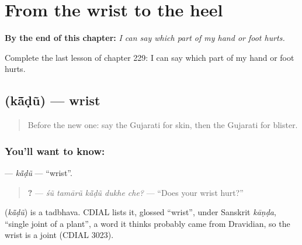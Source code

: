 
\chapter{From the wrist to the heel}
\label{ch:gu-from-the-wrist-to-the-heel}

\begin{chapteropening}
\textbf{By the end of this chapter:} \emph{I can say which part of my hand or foot hurts.}

Complete the last lesson of chapter 229: I can say which part of my hand or foot hurts.
\end{chapteropening}

\section[\texorpdfstring{\gu{કાંડું} (kā̃ḍũ)}{કાંડું (kā̃ḍũ)}]{ (kā̃ḍũ) — wrist}

\label{lesson:GU-C229-kadu}



\begin{quote}
Before the new one: say the Gujarati for skin, then the Gujarati for blister.
\end{quote}

\subsection*{You'll want to know: }
\textbf{} — \emph{kā̃ḍũ} — \textquotedblleft{}wrist\textquotedblright{}.

\begin{quote}
\textbf{    ?} — \emph{śũ tamārũ kā̃ḍũ dukhe che?} — \textquotedblleft{}Does your wrist hurt?\textquotedblright{}
\end{quote}

\begin{cousinweb}
\textbf{} (\emph{kā̃ḍũ}) is a tadbhava. CDIAL lists it, glossed \textquotedblleft{}wrist\textquotedblright{}, under Sanskrit \emph{kāṇḍa}, \textquotedblleft{}single joint of a plant\textquotedblright{}, a word it thinks probably came from Dravidian, so the wrist is a joint (CDIAL 3023).
\end{cousinweb}

